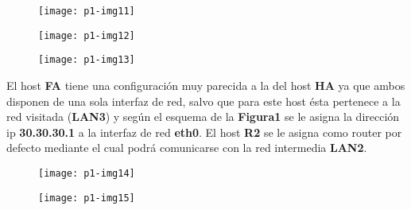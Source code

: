 \documentclass[10pt]{article}
\begin{document}
\begin{figure}[H]
	\begin{center}
 		\texttt{[image: p1-img11]}
	\end{center} 
\end{figure}

\begin{figure}[H]
	\begin{center}
 		\texttt{[image: p1-img12]}
	\end{center} 
\end{figure}

\begin{figure}[H]
	\begin{center}
 		\texttt{[image: p1-img13]}
	\end{center} 
\end{figure}

El host \textbf{FA} tiene una configuración muy parecida a la del host \textbf{HA} ya que ambos disponen de una sola interfaz de red, salvo que para este host ésta pertenece a la red visitada (\textbf{LAN3}) y según el esquema de la \textbf{Figura1} se le asigna la dirección ip \textbf{30.30.30.1} a la interfaz de red \textbf{eth0}. El host \textbf{R2} se le asigna como router por defecto mediante el cual podrá comunicarse con la red intermedia \textbf{LAN2}.\\

\begin{figure}[H]
	\begin{center}
 		\texttt{[image: p1-img14]}
	\end{center} 
\end{figure}

\begin{figure}[H]
	\begin{center}
 		\texttt{[image: p1-img15]}
	\end{center} 
\end{figure}
\end{document}

